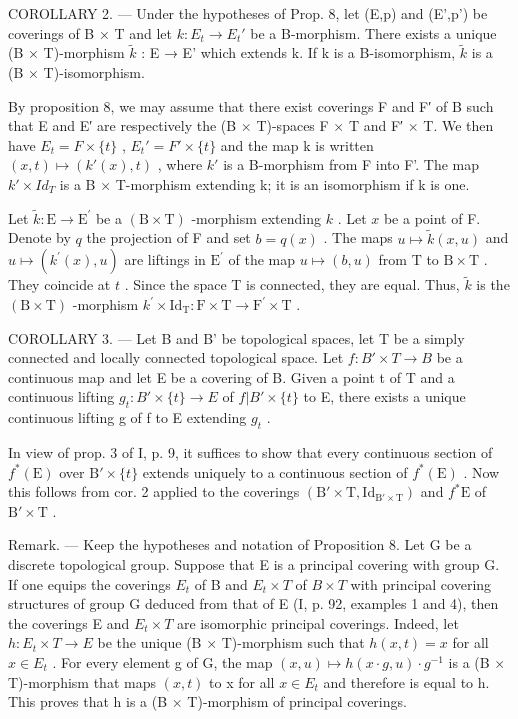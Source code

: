 COROLLARY 2. --- Under the hypotheses of Prop. 8, let (E,p) and (E',p') be coverings of B × T and let \(k: E_t \to E_t'\) be a B-morphism. There exists a unique (B × T)-morphism \(\widetilde{k}\) : E → E' which extends k. If k is a B-isomorphism, \(\widetilde{k}\) is a (B × T)-isomorphism.

By proposition 8, we may assume that there exist coverings F and F′ of B such that E and E′ are respectively the (B × T)-spaces F × T and F′ × T. We then have \(E_{t} = F \times \{t\}\) , \(E_{t}' = F' \times \{t\}\) and the map k is written \((x, t) \mapsto (k'(x), t)\) , where \(k'\) is a B-morphism from F into F'. The map \(k' \times Id_{T}\) is a B × T-morphism extending k; it is an isomorphism if k is one.

Let \(\widetilde{k}\colon\mathrm{E}\to\mathrm{E}^{\prime}\) be a \((\mathrm{B}\times\mathrm{T})\) -morphism extending \(k\) . Let \(x\) be a point of F. Denote by \(q\) the projection of F and set \(b=q(x)\) . The maps \(u\mapsto\widetilde{k}(x,u)\) and \(u\mapsto(k^{\prime}(x),u)\) are liftings in \(\mathrm{E}^{\prime}\) of the map \(u\mapsto(b,u)\) from T to \(\mathrm{B}\times\mathrm{T}\) . They coincide at \(t\) . Since the space T is connected, they are equal. Thus, \(\widetilde{k}\) is the \((\mathrm{B}\times\mathrm{T})\) -morphism \(k^{\prime}\times\mathrm{Id}_{\mathrm{T}}\colon\mathrm{F}\times\mathrm{T}\to\mathrm{F}^{\prime}\times\mathrm{T}\) .

COROLLARY 3. --- Let B and B' be topological spaces, let T be a simply connected and locally connected topological space. Let \(f: B' \times T \to B\) be a continuous map and let E be a covering of B. Given a point t of T and a continuous lifting \(g_t: B' \times \{t\} \to E\) of \(f | B' \times \{t\}\) to E, there exists a unique continuous lifting g of f to E extending \(g_t\) .

In view of prop. 3 of I, p. 9, it suffices to show that every continuous section of \(f^{*}(\mathrm{E})\) over \(\mathrm{B}' \times \{t\}\) extends uniquely to a continuous section of \(f^{*}(\mathrm{E})\) . Now this follows from cor. 2 applied to the coverings \((\mathrm{B}' \times \mathrm{T}, \mathrm{Id}_{\mathrm{B}' \times \mathrm{T}})\) and \(f^{*}\mathrm{E}\) of \(\mathrm{B}' \times \mathrm{T}\) .

Remark. --- Keep the hypotheses and notation of Proposition 8. Let G be a discrete topological group. Suppose that E is a principal covering with group G. If one equips the coverings \(E_{t}\) of B and \(E_{t} \times T\) of \(B \times T\) with principal covering structures of group G deduced from that of E (I, p. 92, examples 1 and 4), then the coverings E and \(E_{t} \times T\) are isomorphic principal coverings. Indeed, let \(h: E_{t} \times T \to E\) be the unique (B × T)-morphism such that \(h(x, t) = x\) for all \(x \in E_{t}\) . For every element g of G, the map \((x, u) \mapsto h(x \cdot g, u) \cdot g^{-1}\) is a (B × T)-morphism that maps \((x, t)\) to x for all \(x \in E_{t}\) and therefore is equal to h. This proves that h is a (B × T)-morphism of principal coverings.

